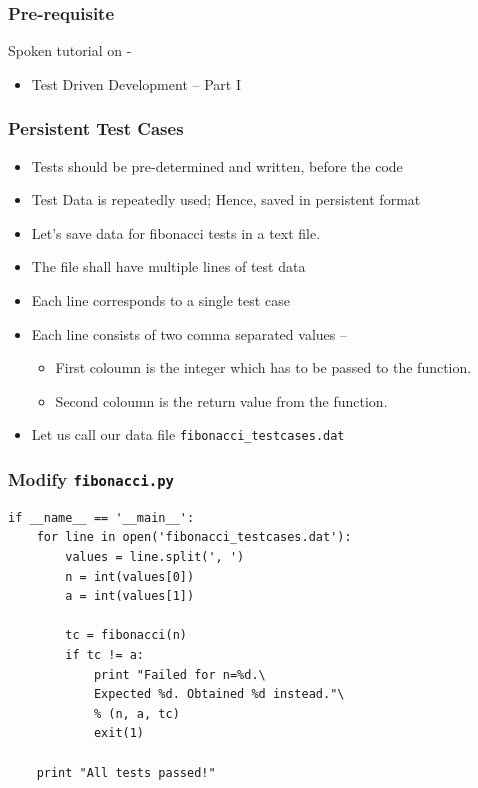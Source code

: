\documentclass[12pt,presentation]{beamer}
\begin{document}
\begin{frame}
\frametitle{Pre-requisite}
\label{sec-3}

Spoken tutorial on -
\begin{itemize}
\item Test Driven Development -- Part I
\end{itemize}
\end{frame}

\begin{frame}[fragile]
  \frametitle{Persistent Test Cases}
  \begin{itemize}
  \item Tests should be pre-determined and written, before the code
  \item Test Data is repeatedly used; Hence, saved in persistent
    format
  \item Let's save data for fibonacci tests in a text file. 
  \item The file shall have multiple lines of test data
  \item Each line corresponds to a single test case
  \item Each line consists of two comma separated values --
    \begin{itemize}
    \item First coloumn is the integer which has to be
      passed to the function.
    \item Second coloumn is the return value from the function.
    \end{itemize}
  \item Let us call our data file \texttt{fibonacci\_testcases.dat}
  \end{itemize}
\end{frame}
\begin{frame}[fragile]
  \frametitle{Modify \texttt{fibonacci.py}}
\begin{lstlisting}
if __name__ == '__main__':
    for line in open('fibonacci_testcases.dat'):
        values = line.split(', ')
        n = int(values[0])
        a = int(values[1])

        tc = fibonacci(n)
        if tc != a:
            print "Failed for n=%d.\
            Expected %d. Obtained %d instead."\
            % (n, a, tc)
            exit(1)

    print "All tests passed!"
\end{lstlisting}
\end{frame}
\end{document}
